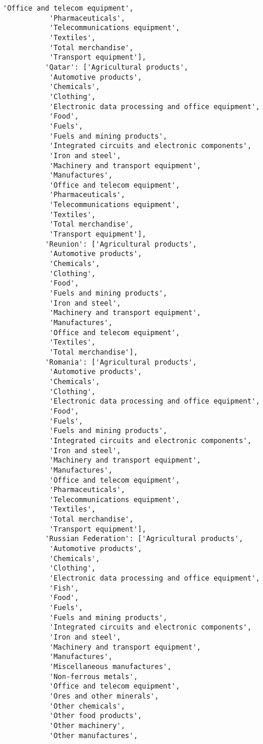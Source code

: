 \documentclass[11pt]{article}
\begin{document}
\begin{Verbatim}[commandchars=\\\{\}]
           'Office and telecom equipment',
           'Pharmaceuticals',
           'Telecommunications equipment',
           'Textiles',
           'Total merchandise',
           'Transport equipment'],
          'Qatar': ['Agricultural products',
           'Automotive products',
           'Chemicals',
           'Clothing',
           'Electronic data processing and office equipment',
           'Food',
           'Fuels',
           'Fuels and mining products',
           'Integrated circuits and electronic components',
           'Iron and steel',
           'Machinery and transport equipment',
           'Manufactures',
           'Office and telecom equipment',
           'Pharmaceuticals',
           'Telecommunications equipment',
           'Textiles',
           'Total merchandise',
           'Transport equipment'],
          'Reunion': ['Agricultural products',
           'Automotive products',
           'Chemicals',
           'Clothing',
           'Food',
           'Fuels and mining products',
           'Iron and steel',
           'Machinery and transport equipment',
           'Manufactures',
           'Office and telecom equipment',
           'Textiles',
           'Total merchandise'],
          'Romania': ['Agricultural products',
           'Automotive products',
           'Chemicals',
           'Clothing',
           'Electronic data processing and office equipment',
           'Food',
           'Fuels',
           'Fuels and mining products',
           'Integrated circuits and electronic components',
           'Iron and steel',
           'Machinery and transport equipment',
           'Manufactures',
           'Office and telecom equipment',
           'Pharmaceuticals',
           'Telecommunications equipment',
           'Textiles',
           'Total merchandise',
           'Transport equipment'],
          'Russian Federation': ['Agricultural products',
           'Automotive products',
           'Chemicals',
           'Clothing',
           'Electronic data processing and office equipment',
           'Fish',
           'Food',
           'Fuels',
           'Fuels and mining products',
           'Integrated circuits and electronic components',
           'Iron and steel',
           'Machinery and transport equipment',
           'Manufactures',
           'Miscellaneous manufactures',
           'Non-ferrous metals',
           'Office and telecom equipment',
           'Ores and other minerals',
           'Other chemicals',
           'Other food products',
           'Other machinery',
           'Other manufactures',

\end{Verbatim}
\end{document}
